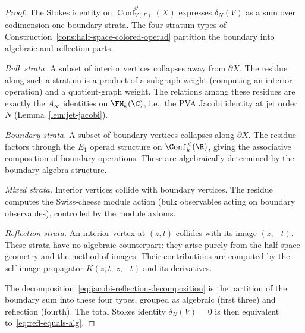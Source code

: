 \begin{proof}
The Stokes identity on
$\overline{\operatorname{Conf}}^{\partial}_{V(\Gamma)}(X)$ expresses
$\delta_N(V)$ as a sum over codimension-one boundary strata. The
four stratum types of
Construction~\ref{cons:half-space-colored-operad} partition the
boundary into algebraic and reflection parts.

\emph{Bulk strata.}
A subset of interior vertices collapses away from $\partial X$.
The residue along such a stratum is a product of a subgraph
weight (computing an interior operation) and a quotient-graph weight.
The relations among these residues are exactly the $A_\infty$
identities on $\FM_k(\C)$, i.e., the PVA Jacobi identity at jet
order $N$ (Lemma~\ref{lem:jet-jacobi}).

\emph{Boundary strata.}
A subset of boundary vertices collapses along $\partial X$.
The residue factors through the $E_1$ operad structure on
$\Conf_k^{<}(\R)$, giving the associative composition of boundary
operations. These are algebraically determined by the boundary
algebra structure.

\emph{Mixed strata.}
Interior vertices collide with boundary vertices. The residue
computes the Swiss-cheese module action (bulk observables acting on
boundary observables), controlled by the module axioms.

\emph{Reflection strata.}
An interior vertex at $(z,t)$ collides with its image
$(z,-t)$. These strata have no algebraic counterpart: they
arise purely from the half-space geometry and the method of images.
Their contributions are computed by the self-image propagator
$K(z,t;\,z,-t)$ and its derivatives.

The decomposition~\eqref{eq:jacobi-reflection-decomposition} is the
partition of the boundary sum into these four types, grouped as
algebraic (first three) and reflection (fourth). The total Stokes
identity $\delta_N(V)=0$ is then
equivalent to~\eqref{eq:refl-equals-alg}.
\end{proof}

